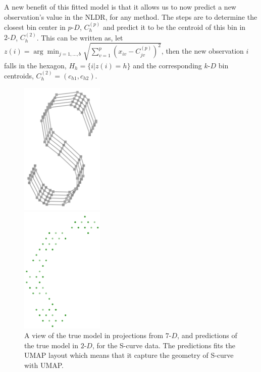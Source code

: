 \documentclass[
  12pt]{article}
\newcommand\pD{$p\text{-}D$}
\newcommand\kD{$k\text{-}D$}
\newcommand\gD{$2\text{-}D$}
\begin{document}
A new benefit of this fitted model is that it allows us to now predict a
new observation's value in the NLDR, for any method. The steps are to
determine the closest bin center in \pD{}, \(C^{(p)}_{h}\) and predict
it to be the centroid of this bin in \gD{}, \(C^{(2)}_{h}\). This can be
written as, let
\(z(i) = \arg\min_{j = 1, \dots, b} \sqrt{\sum_{v=1}^{p}(x_{iv} - C^{(p)}_{jv})^2}\),
then the new observation \(i\) falls in the hexagon,
\(H_h = \{i| z(i) = h\}\) and the corresponding \kD{} bin centroids,
\(C_{h}^{(2)} = (c_{h1}, c_{h2})\).

\begin{figure}[H]

\begin{minipage}{0.50\linewidth}
\begin{center}
\includegraphics[width=1.5625in,height=\textheight]{figures/scurve/sc_true_only.png}
\end{center}
\end{minipage}%
%
\begin{minipage}{0.50\linewidth}
\begin{center}
\includegraphics[width=1.5625in,height=\textheight]{figures/scurve/pred_true_view.png}
\end{center}
\end{minipage}%

\caption{\label{fig-scurve-pred-sc}A view of the true model in
projections from \(7\text{-}D\), and predictions of the true model in
\gD{}, for the S-curve data. The predictions fits the UMAP layout which
means that it capture the geometry of S-curve with UMAP.}

\end{figure}%
\end{document}
